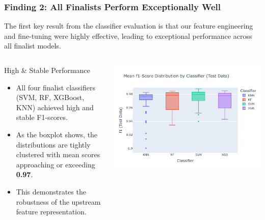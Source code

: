 \documentclass[aspectratio=169,10pt]{beamer}
\begin{document}
\begin{frame}
    \frametitle{Finding 2: All Finalists Perform Exceptionally Well}
    
    The first key result from the classifier evaluation is that our feature engineering and fine-tuning were highly effective, leading to exceptional performance across all finalist models.
    
    \begin{columns}[T]
        \begin{column}{0.35\textwidth}
            \begin{block}{High \& Stable Performance}
                \begin{itemize}
                    \item All four finalist classifiers (SVM, RF, XGBoost, KNN) achieved high and stable F1-scores.
                    \item As the boxplot shows, the distributions are tightly clustered with mean scores approaching or exceeding \textbf{0.97}.
                    \item This demonstrates the robustness of the upstream feature representation.
                \end{itemize}
            \end{block}
        \end{column}
        
        \begin{column}{0.6\textwidth}
            
            \centering
            \includegraphics[width=\textwidth]{classifier_f1score_boxplot_test.pdf} %
            

\end{column}
\end{columns}
\end{frame}
\end{document}
